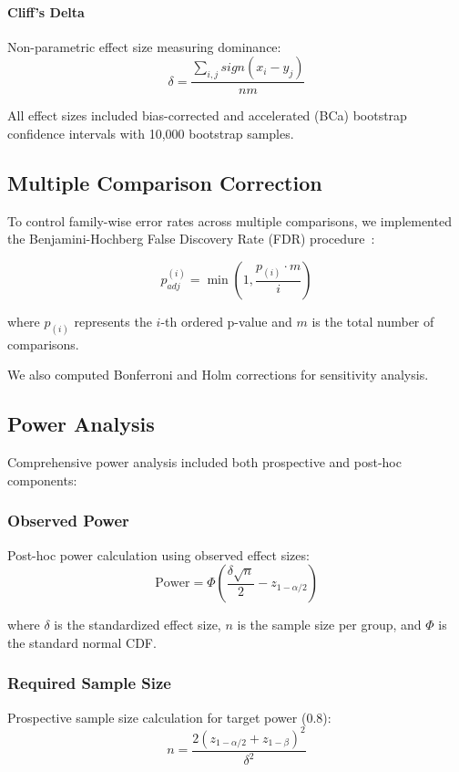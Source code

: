 \documentclass[conference]{IEEEtran}
\begin{document}
\paragraph{Cliff's Delta}
Non-parametric effect size measuring dominance:
\begin{equation}
\delta = \frac{\sum_{i,j} sign(x_i - y_j)}{nm}
\end{equation}

All effect sizes included bias-corrected and accelerated (BCa) bootstrap confidence intervals with 10,000 bootstrap samples.

\subsection{Multiple Comparison Correction}
\label{subsec:multiple_comparisons}

To control family-wise error rates across multiple comparisons, we implemented the Benjamini-Hochberg False Discovery Rate (FDR) procedure~\cite{benjamini1995controlling}:

\begin{equation}
p_{adj}^{(i)} = \min\left(1, \frac{p_{(i)} \cdot m}{i}\right)
\end{equation}

where $p_{(i)}$ represents the $i$-th ordered p-value and $m$ is the total number of comparisons.

We also computed Bonferroni and Holm corrections for sensitivity analysis.

\subsection{Power Analysis}
\label{subsec:power_analysis}

Comprehensive power analysis included both prospective and post-hoc components:

\subsubsection{Observed Power}
Post-hoc power calculation using observed effect sizes:
\begin{equation}
\text{Power} = \Phi\left(\frac{\delta\sqrt{n}}{2} - z_{1-\alpha/2}\right)
\end{equation}

where $\delta$ is the standardized effect size, $n$ is the sample size per group, and $\Phi$ is the standard normal CDF.

\subsubsection{Required Sample Size}
Prospective sample size calculation for target power (0.8):
\begin{equation}
n = \frac{2(z_{1-\alpha/2} + z_{1-\beta})^2}{\delta^2}
\end{equation}
\end{document}
